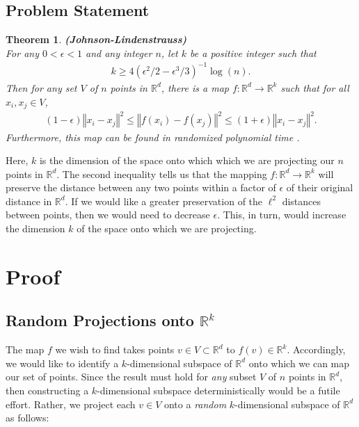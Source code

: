 \documentclass{article}
\newtheorem{theorem}{Theorem}
\begin{document}
\subsection{Problem Statement}

\begin{theorem} \textbf{(Johnson-Lindenstrauss)}\\
    For any $0 < \epsilon < 1$ and any integer $n$, let $k$ be a positive integer such that
    \begin{align*}
        k \geq 4(\epsilon^2/2 - \epsilon^3/3)^{-1} \log(n).
    \end{align*}
    Then for any set $V$ of $n$ points in $\mathbb{R}^d$, there is a map $f: \mathbb{R}^d \rightarrow \mathbb{R}^k$ such that for all $x_i, x_j \in V$,
    \begin{align*}
        (1 - \epsilon) \left \Vert x_i - x_j \right \Vert^2 \leq \left \Vert f(x_i) - f(x_j) \right \Vert^2 \leq (1 + \epsilon) \left \Vert x_i - x_j \right \Vert^2.
    \end{align*}
    Furthermore, this map can be found in randomized polynomial time \cite{dasgupta1999elementary}.
\end{theorem}

\noindent
Here, $k$ is the dimension of the space onto which which we are projecting our $n$ points in $\mathbb{R}^d$. The second inequality tells us that the mapping $f: \mathbb{R}^d \rightarrow \mathbb{R}^k$ will preserve the distance between any two points within a factor of $\epsilon$ of their original distance in $\mathbb{R}^d$. If we would like a greater preservation of the $\ell^2$ distances between points, then we would need to decrease $\epsilon$. This, in turn, would increase the dimension $k$ of the space onto which we are projecting.

\section{Proof}

\subsection{Random Projections onto $\mathbb{R}^k$}\label{ss1:randproj}

The map $f$ we wish to find takes points $v \in V \subset \mathbb{R}^d$ to $f(v) \in \mathbb{R}^k$. Accordingly, we would like to identify a $k$-dimensional subspace of $\mathbb{R}^d$ onto which we can map our set of points. Since the result must hold for \textit{any} subset $V$ of $n$ points in $\mathbb{R}^d$, then constructing a $k$-dimensional subspace deterministically would be a futile effort. Rather, we project each $v \in V$ onto a \textit{random} $k$-dimensional subspace of $\mathbb{R}^d$ as follows:
\end{document}
